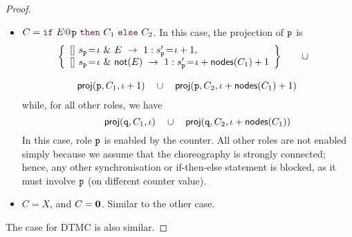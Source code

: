 \begin{proof}
\begin{itemize}
  \item $C=\ifTE {E}{p}{C_1}{C_2}$. In this case, the projection of
      $\mathtt{p}$ is
      \begin{equation*}
        \begin{array}{lll}
          \left\{ 
          \begin{array}{lll}
            \commandBase {} {s_{\role p}\!=\! \iota\ \&\ E}{\ 1: s'_{\role p}\!=\! \iota+1},\\ 
            \commandBase {} {s_{\role p}\!=\! \iota\ \&\ \mathsf{not}(E)}
            {\ 1: s'_{\role p}\!=\! \iota+\mathsf{nodes}(C_1)+1}
          \end{array}
          \right\}
          \qquad\cup\quad 
          \\\\
          \qquad\proj (\role{p}, C_1, \iota+1)
          \quad\cup\quad
          \proj (\role{p}, C_2, \iota+\mathsf{nodes}(C_1)+1)
        \end{array}
      \end{equation*}
      while, for all other roles, we have
      \begin{equation*}
          \qquad \mathsf{proj} (\mathtt{q}, C_1, \iota)
          \quad\cup\quad
          \mathsf{proj} (\mathtt{q}, C_2, \iota+\mathsf{nodes}(C_1))
      \end{equation*}
      In this case, role $\mathtt{p}$ is enabled by the counter. All
      other roles are not enabled simply because we assume that the
      choreography is strongly connected; hence, any other
      synchronisation or if-then-else statement is blocked, as it must
      involve $\mathtt{p}$ (on different counter value).

    \item $C=X$, and $C=\mathbf{0}$. Similar to the other case.
  \end{itemize}


  The case for DTMC is also similar.




\end{proof}

